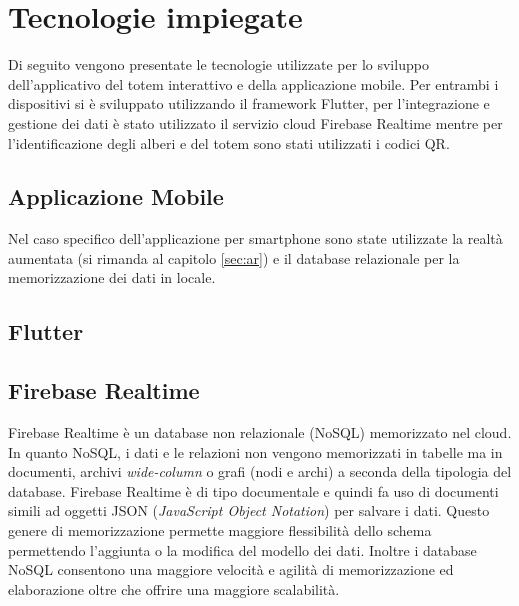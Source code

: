 \section{Tecnologie impiegate}
Di seguito vengono presentate le tecnologie utilizzate per lo sviluppo dell'applicativo del totem interattivo e della applicazione mobile. Per entrambi i dispositivi si è sviluppato utilizzando il framework Flutter, per l'integrazione e gestione dei dati è stato utilizzato il servizio cloud Firebase Realtime mentre per l'identificazione degli alberi e del totem sono stati utilizzati i codici QR.

\subsection{Applicazione Mobile}
Nel caso specifico dell'applicazione per smartphone sono state utilizzate la realtà aumentata (si rimanda al capitolo \ref{sec:ar}) e il database relazionale per la memorizzazione dei dati in locale.

\subsection{Flutter}

%
\subsection{Firebase Realtime}
Firebase Realtime è un database non relazionale (NoSQL) memorizzato nel cloud. In quanto NoSQL, i dati e le relazioni non vengono memorizzati in tabelle ma in documenti, archivi \textit{wide-column} o grafi (nodi e archi) a seconda della tipologia del database.
Firebase Realtime è di tipo documentale e quindi fa uso di documenti simili ad oggetti JSON (\textit{JavaScript Object Notation}) per salvare i dati. Questo genere di memorizzazione permette maggiore flessibilità dello schema permettendo l'aggiunta o la modifica del modello dei dati. Inoltre i database NoSQL consentono una maggiore velocità e agilità di memorizzazione ed elaborazione oltre che offrire una maggiore scalabilità.

